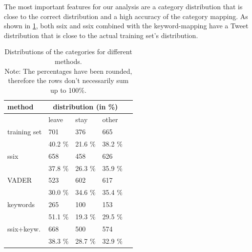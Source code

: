 \documentclass{emulateapj}
\begin{document}
The most important features for our analysis are a category distribution that is close to the correct distribution and a high accuracy of the category mapping.
 As shown in \cref{table:distributions}, both ssix and ssix combined with the keyword-mapping have a Tweet distribution that is close to the actual training set's distribution.
\begin{table}
\centering
{\ttfamily
  \begin{tabular}{|l|l|l|l|l|}
    \hline
	method & \multicolumn{3}{|c|}{distribution (in \%)} \\ \hline
      & leave & stay & other\\ \hline \hline
	training set & 701 & 376 & 665  \\
	& 40.2 \% & 21.6 \%  & 38.2 \% \\ \hline
	ssix & 658 & 458 & 626 \\
	& 37.8 \% & 26.3 \%  & 35.9 \% \\ \hline 
	VADER & 523 & 602 & 617 \\ 
	& 30.0 \% & 34.6 \%  & 35.4 \% \\ \hline 
	keywords & 265 & 100 & 153  \\ 
	& 51.1 \% & 19.3 \%  & 29.5 \% \\ \hline 
	ssix+keyw. & 668 & 500 & 574 \\ 
	& 38.3 \% & 28.7 \%  & 32.9 \% \\ \hline 
  \end{tabular}
}
\caption{\textnormal{Distributions of the categories for different methods. \\
         Note: The percentages have been rounded, therefore the rows don't necessarily sum up to 100\%.}}
\label{table:distributions}
\end{table}
\end{document}

